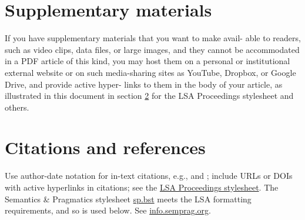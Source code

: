 \documentclass[12pt,letterpaper]{article}
\begin{document}
 
 \section{Supplementary materials} If you have supplementary materials that you want to make avail- able to readers, such as video clips, data files, or large images, and they cannot be accommodated in a PDF article of this kind, you may host them on a personal or institutional external website or on such media-sharing sites as YouTube, Dropbox, or Google Drive, and provide active hyper- links to them in the body of your article, as illustrated in this document in section \ref{s:cite} for the LSA Proceedings stylesheet and others.
 
 
 
\section{Citations and references} \label{s:cite} Use author-date notation for in-text citations, e.g., \citep{partee:1984b} and \citet{partee:1984b}; include URLs or DOIs with active hyperlinks in citations; see the \href{http://journals.linguisticsociety.org/proceedings/index.php/PLSA/pages/view/instructions}{LSA Proceedings stylesheet}. The Semantics \& Pragmatics stylesheet \href{https://raw.githubusercontent.com/semprag/tex/master/sp.bst}{sp.bst} meets the LSA formatting requirements, and so is used below. See \href{http://info.semprag.org}{info.semprag.org}. 
 
\setlength{\bibhang}{0.4in}			%
\titleformat{\section}{\normalfont\bfseries}{\thesection}{.5em}{}		%


\newcommand{\doi}[1]{\href{http://dx.doi.org/#1}{http://dx.doi.org/#1}}	%
\end{document}
